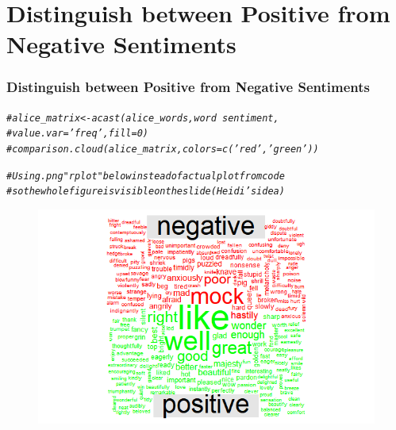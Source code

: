 \documentclass{beamer}\usepackage[]{graphicx}\usepackage[]{color}
\makeatletter
\newcommand{\hlcom}[1]{\textcolor[rgb]{0.678,0.584,0.686}{\textit{#1}}}%
\newenvironment{kframe}{%
 \def\at@end@of@kframe{}%
 \ifinner\ifhmode%
  \def\at@end@of@kframe{\end{minipage}}%
  \begin{minipage}{\columnwidth}%
 \fi\fi%
 \def\FrameCommand##1{\hskip\@totalleftmargin \hskip-\fboxsep
 \colorbox{shadecolor}{##1}\hskip-\fboxsep
     \hskip-\linewidth \hskip-\@totalleftmargin \hskip\columnwidth}%
 \MakeFramed {\advance\hsize-\width
   \@totalleftmargin\z@ \linewidth\hsize
   \@setminipage}}%
 {\par\unskip\endMakeFramed%
 \at@end@of@kframe}
\newenvironment{knitrout}{}{} %
\makeatother
\begin{document}
\section{Distinguish between Positive from Negative Sentiments}
 \begin{frame}
  \frametitle{Distinguish between Positive from Negative Sentiments}
\begin{knitrout}
\color{fgcolor}\begin{kframe}
\begin{alltt}
\hlcom{#alice_matrix<-acast(alice_words,word~sentiment,}
                    \hlcom{#value.var='freq',fill=0)}
\hlcom{#comparison.cloud(alice_matrix,colors=c('red','green'))}

\hlcom{#Using .png "rplot" below instead of actual plot from code }
\hlcom{#so the whole figure is visible on the slide (Heidi's idea)}
\end{alltt}
\end{kframe}
\end{knitrout}

\begin{figure}
\includegraphics[scale=0.5]{rplot}
\end{figure}

\end{frame}
\end{document}
